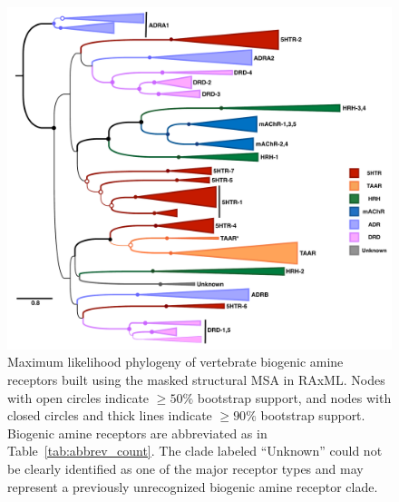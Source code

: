 \documentclass[fleqn,10pt]{wlpeerj}
\begin{document}
\begin{figure}[htbp]
	\centerline{\includegraphics[width=18cm]{figures/masked_part_phylogeny.pdf}}
	\caption{\label{phylogeny} Maximum likelihood phylogeny of vertebrate biogenic amine receptors built using the masked structural MSA in RAxML. Nodes with open circles indicate $\geq 50\%$ bootstrap support, and nodes with closed circles and thick lines indicate $\geq 90\%$ bootstrap support. Biogenic amine receptors are abbreviated as in Table~\ref{tab:abbrev_count}. The clade labeled ``Unknown'' could not be clearly identified as one of the major receptor types and may represent a previously unrecognized biogenic amine receptor clade.}
\end{figure}


\newpage
\end{document}
